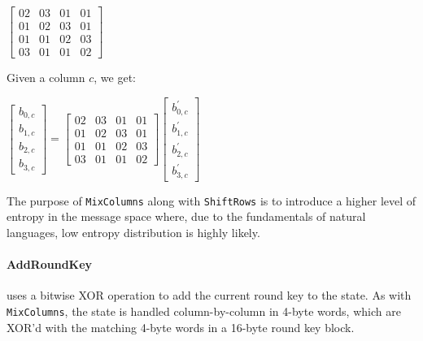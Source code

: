     \begin{center}
      $\begin{bmatrix}
        02 & 03 & 01 & 01 \\
        01 & 02 & 03 & 01 \\
        01 & 01 & 02 & 03 \\
        03 & 01 & 01 & 02
      \end{bmatrix}$
    \end{center}
    
    Given a column $c$, we get:
    
    \begin{center}
      $ \begin{bmatrix}
        b_{0,c} \\ b_{1,c} \\ b_{2,c} \\ b_{3,c}
      \end{bmatrix} =
      \begin{bmatrix}
        02 & 03 & 01 & 01 \\
        01 & 02 & 03 & 01 \\
        01 & 01 & 02 & 03 \\
        03 & 01 & 01 & 02
      \end{bmatrix}
      \begin{bmatrix}
        b_{0,c}^{'} \\ b_{1,c}^{'} \\ b_{2,c}^{'} \\ b_{3,c}^{'}
      \end{bmatrix}$
    \end{center}
    
    The purpose of \verb!MixColumns! along with \verb!ShiftRows! is to introduce a higher level of entropy in the message space where, due to the fundamentals of natural languages, low entropy distribution is highly likely.
    
    \paragraph{AddRoundKey} uses a bitwise XOR operation to add the current round key to the state. As with \verb!MixColumns!, the state is handled column-by-column in 4-byte words, which are XOR'd with the matching 4-byte words in a 16-byte round key block.
    \label{para:addroundkey}
    

